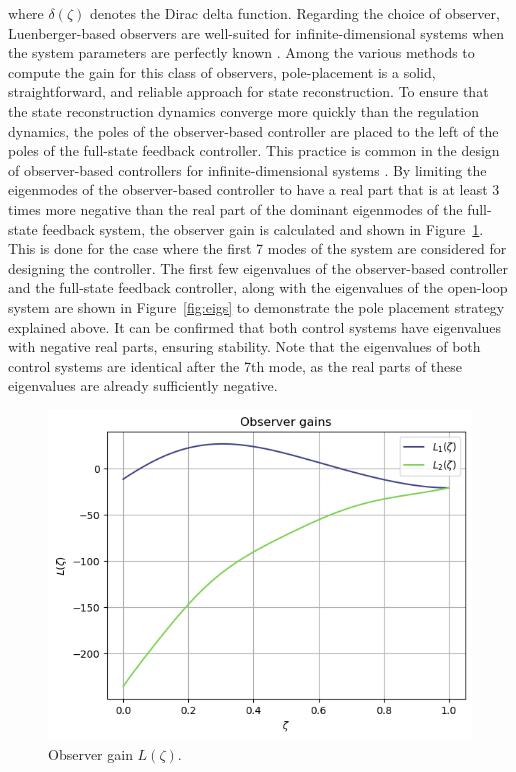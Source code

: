 where $\delta(\zeta)$ denotes the Dirac delta function. Regarding the choice of observer, Luenberger-based observers are well-suited for infinite-dimensional systems when the system parameters are perfectly known \autocite{ali2015reviewobserver}. Among the various methods to compute the gain for this class of observers, pole-placement is a solid, straightforward, and reliable approach for state reconstruction. To ensure that the state reconstruction dynamics converge more quickly than the regulation dynamics, the poles of the observer-based controller are placed to the left of the poles of the full-state feedback controller. This practice is common in the design of observer-based controllers for infinite-dimensional systems \autocite{morrisbook}. By limiting the eigenmodes of the observer-based controller to have a real part that is at least 3 times more negative than the real part of the dominant eigenmodes of the full-state feedback system, the observer gain is calculated and shown in Figure~\ref{fig:L_modes}. This is done for the case where the first 7 modes of the system are considered for designing the controller. The first few eigenvalues of the observer-based controller and the full-state feedback controller, along with the eigenvalues of the open-loop system are shown in Figure~\ref{fig:eigs} to demonstrate the pole placement strategy explained above. It can be confirmed that both control systems have eigenvalues with negative real parts, ensuring stability. Note that the eigenvalues of both control systems are identical after the 7th mode, as the real parts of these eigenvalues are already sufficiently negative.

\begin{figure}[ht]
    \centering
    \includegraphics[width=\textwidth]{Figures/L.png}
    \caption{Observer gain $L(\zeta)$.}
    \label{fig:L_modes}
\end{figure}

